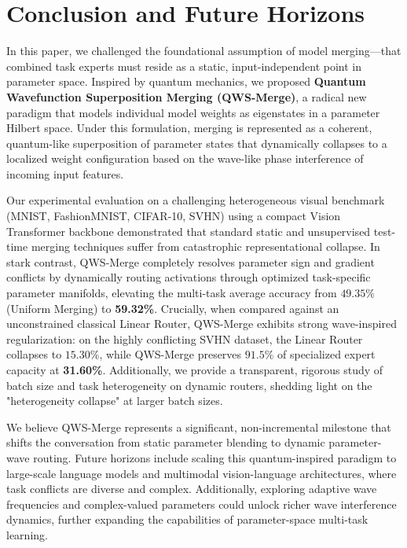 \section{Conclusion and Future Horizons}
\label{sec:conclusion}

In this paper, we challenged the foundational assumption of model merging---that combined task experts must reside as a static, input-independent point in parameter space. Inspired by quantum mechanics, we proposed \textbf{Quantum Wavefunction Superposition Merging (QWS-Merge)}, a radical new paradigm that models individual model weights as eigenstates in a parameter Hilbert space. Under this formulation, merging is represented as a coherent, quantum-like superposition of parameter states that dynamically collapses to a localized weight configuration based on the wave-like phase interference of incoming input features.

Our experimental evaluation on a challenging heterogeneous visual benchmark (MNIST, FashionMNIST, CIFAR-10, SVHN) using a compact Vision Transformer backbone demonstrated that standard static and unsupervised test-time merging techniques suffer from catastrophic representational collapse. In stark contrast, QWS-Merge completely resolves parameter sign and gradient conflicts by dynamically routing activations through optimized task-specific parameter manifolds, elevating the multi-task average accuracy from $49.35\%$ (Uniform Merging) to \textbf{59.32\%}. Crucially, when compared against an unconstrained classical Linear Router, QWS-Merge exhibits strong wave-inspired regularization: on the highly conflicting SVHN dataset, the Linear Router collapses to $15.30\%$, while QWS-Merge preserves $91.5\%$ of specialized expert capacity at \textbf{31.60\%}. Additionally, we provide a transparent, rigorous study of batch size and task heterogeneity on dynamic routers, shedding light on the "heterogeneity collapse" at larger batch sizes.

We believe QWS-Merge represents a significant, non-incremental milestone that shifts the conversation from static parameter blending to dynamic parameter-wave routing. Future horizons include scaling this quantum-inspired paradigm to large-scale language models and multimodal vision-language architectures, where task conflicts are diverse and complex. Additionally, exploring adaptive wave frequencies and complex-valued parameters could unlock richer wave interference dynamics, further expanding the capabilities of parameter-space multi-task learning.
